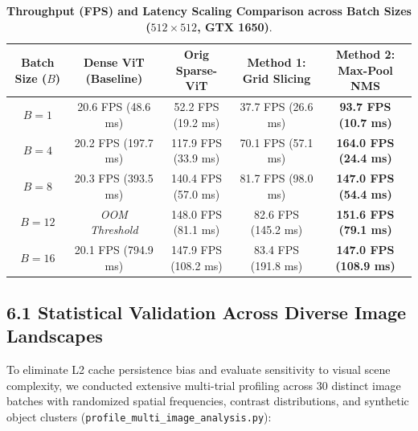 \documentclass[11pt,a4paper]{article}
\begin{document}
\begin{table}[H]
\centering
\small
\renewcommand{\arraystretch}{1.2}
\setlength{\tabcolsep}{8pt}
\begin{tabular}{ccccc}
\toprule
\textbf{Batch Size ($B$)} & \textbf{Dense ViT (Baseline)} & \textbf{Orig Sparse-ViT} & \textbf{Method 1: Grid Slicing} & \textbf{Method 2: Max-Pool NMS} \\
\midrule
$B = 1$  & 20.6 FPS (48.6 ms)  &  52.2 FPS (19.2 ms) & 37.7 FPS (26.6 ms) & \textbf{93.7 FPS (10.7 ms)} \\
$B = 4$  & 20.2 FPS (197.7 ms) & 117.9 FPS (33.9 ms) & 70.1 FPS (57.1 ms) & \textbf{164.0 FPS (24.4 ms)} \\
$B = 8$  & 20.3 FPS (393.5 ms) & 140.4 FPS (57.0 ms) & 81.7 FPS (98.0 ms) & \textbf{147.0 FPS (54.4 ms)} \\
$B = 12$ & \textit{OOM Threshold} & 148.0 FPS (81.1 ms) & 82.6 FPS (145.2 ms)& \textbf{151.6 FPS (79.1 ms)} \\
$B = 16$ & 20.1 FPS (794.9 ms) & 147.9 FPS (108.2 ms)& 83.4 FPS (191.8 ms)& \textbf{147.0 FPS (108.9 ms)} \\
\bottomrule
\end{tabular}
\caption{\textbf{Throughput (FPS) and Latency Scaling Comparison across Batch Sizes ($512\times 512$, GTX 1650)}.}
\label{tab:fps_scaling}
\end{table}

\subsection*{6.1 Statistical Validation Across Diverse Image Landscapes}

To eliminate L2 cache persistence bias and evaluate sensitivity to visual scene complexity, we conducted extensive multi-trial profiling across 30 distinct image batches with randomized spatial frequencies, contrast distributions, and synthetic object clusters (\texttt{profile\_multi\_image\_analysis.py}):
\end{document}
